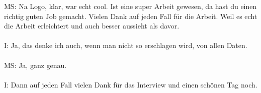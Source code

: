 \begin{linenumbers}
MS: Na Logo, klar, war echt cool. Ist eine super Arbeit gewesen, da hast du einen richtig guten Job gemacht. Vielen Dank auf jeden Fall für die Arbeit. Weil es echt die Arbeit erleichtert und auch besser aussieht als davor.\\\\
I: Ja, das denke ich auch, wenn man nicht so erschlagen wird, von allen Daten.\\\\
MS: Ja, ganz genau.\\\\
I: Dann auf jeden Fall vielen Dank für das Interview und einen schönen Tag noch.
\end{linenumbers}